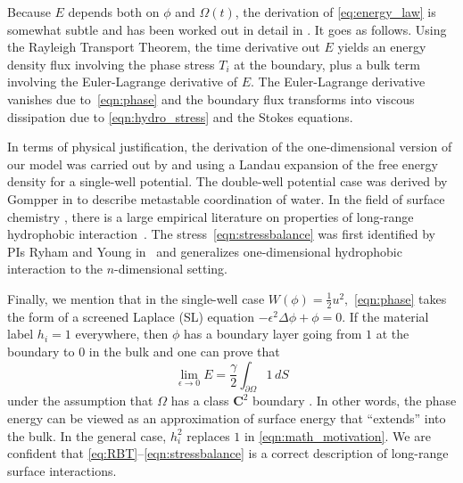 Because $E$ depends both on $\phi$ and $\Omega(t)$,
the derivation of \eqref{eq:energy_law}
is somewhat subtle and has been worked out in detail in \cite{Fu2018_SIAM}.
It goes as follows.
Using the Rayleigh Transport Theorem, 
the time derivative out $E$ yields an energy
density flux involving the phase stress $T_i$
at the boundary, plus a bulk term involving 
the Euler-Lagrange derivative of $E.$
The Euler-Lagrange derivative vanishes due to~\eqref{eqn:phase}
and the boundary flux transforms into viscous dissipation due to 
\eqref{eqn:hydro_stress} and the Stokes equations. 


In terms of physical justification, the
derivation of the one-dimensional version of our model
was carried out by \cite{MaRa76} and \cite{ErLjCl89}
using a Landau expansion of the
free energy density for a single-well potential.
The double-well potential case was derived by
Gompper in \cite{GoHaKo94} to describe metastable coordination of water.
In the field of surface chemistry \cite{Israelachvili1954},
there is a large empirical literature on properties of
long-range hydrophobic interaction~\cite{LeRaPa77,KoNa15,
Nagle17,Lum1999, Lin2005, Meyer2006, Ducker2016,Jackson2016,Gletal88,Aketal17,Ch05}.
The stress~\eqref{eqn:stressbalance} was first
identified by PIs Ryham and Young in~\cite{Fu2018_SIAM}
and generalizes one-dimensional hydrophobic interaction to
the $n$-dimensional setting. 

Finally, we mention that in the single-well case
$W(\phi) = \tfrac{1}{2}u^2,$ \eqref{eqn:phase} takes the form
of a screened Laplace (SL) equation $-\epsilon^2 \Delta \phi + \phi =0$.
If the material label $h_i = 1$ everywhere, then $\phi$
has a boundary layer going from $1$ at the boundary to $0$ in the bulk
and one can prove that 
\begin{equation}
\label{eqn:math_motivation}
\lim_{\epsilon \to 0} E = \frac{\gamma}{2} \int_{\partial \Omega} 1 \,dS
\end{equation}
under the assumption that $\Omega$ has a class $\mathbf{C}^2$ boundary \cite{}.
In other words, the phase energy can be viewed as an
approximation of surface energy that ``extends'' into the bulk.
In the general case, $h_i^2$ replaces $1$ in \eqref{eqn:math_motivation}.
We are confident that \eqref{eq:RBT}--\eqref{eqn:stressbalance}
is a correct description of long-range surface interactions.

